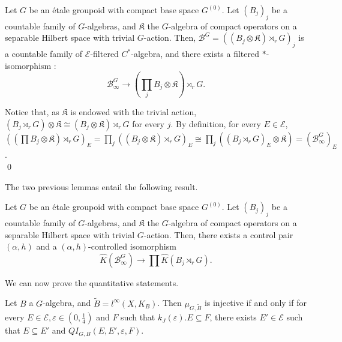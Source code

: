 \begin{lem} Let $G$ be an étale groupoid with compact base space $G^{(0)}$. Let $(B_j)_j$ be a countable family of $G$-algebras, and $\mathfrak K$ the $G$-algebra of compact operators on a separable Hilbert space with trivial $G$-action. Then, $\mathcal B^G = ((B_j\otimes \mathfrak K)\rtimes_r G)_j$ is a countable family of $\mathcal E$-filtered $C^*$-algebra, and there exists a filtered $*$-isomorphism :
\[\mathcal B^G_\infty \rightarrow (\prod_j B_j\otimes\mathfrak K)\rtimes_r G .\]
\end{lem}

\begin{dem} Notice that, as $\mathfrak K$ is endowed with the trivial action, $(B_j\rtimes_r G)\otimes\mathfrak K \cong (B_j\otimes\mathfrak K)\rtimes_r G$ for every $j$. By definition, for every $E\in \mathcal E$,  $\left( (\prod B_j\otimes\mathfrak K)\rtimes_r G \right)_E = \prod_j \left( (B_j\otimes\mathfrak K)\rtimes_r G\right)_E \cong \prod_j \left((B_j\rtimes_r G)_E \otimes \mathfrak K \right) = (\mathcal B^G_\infty )_E$.\\
\qed
\end{dem}

The two previous lemmas entail the following result.

\begin{cor} \label{controlledprod} Let $G$ be an étale groupoid with compact base space $G^{(0)}$. Let $(B_j)_j$ be a countable family of $G$-algebras, and $\mathfrak K$ the $G$-algebra of compact operators on a separable Hilbert space with trivial $G$-action. Then, there exists a control pair $(\alpha, h)$ and a $(\alpha, h)$-controlled isomorphism
\[ \hat K(\mathcal B^G_\infty) \rightarrow \prod \hat K(B_j\rtimes_r G). \]
\end{cor}
We can now prove the quantitative statements.\\

\begin{thm}\label{Quant1}
Let $B$ a $G$-algebra, and $\tilde B = l^\infty(X,K_B)$. Then $\mu_{G,\tilde B}$ is injective if and only if for every $E\in\mathcal E,\varepsilon\in(0,\frac{1}{4})$ and $F$ such that $k_J(\varepsilon).E\subseteq F$, there exists $E' \in\mathcal E$ such that $E\subseteq E'$ and $QI_{G,B}(E,E',\varepsilon,F)$. 
\end{thm}

